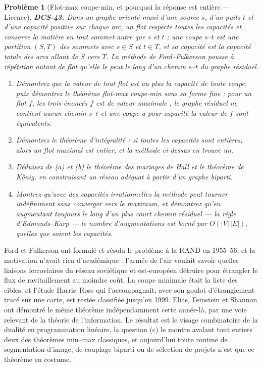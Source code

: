 \documentclass[11pt]{article}
\newtheorem{problem}{Problème}
\begin{document}
\begin{problem}[{Flot-max coupe-min, et pourquoi la réponse est entière --- Licence}]
\textbf{DCS-43.} Dans un graphe orienté muni d'une source $ s $, d'un puits $ t $ et d'une capacité positive sur chaque arc, un \textit{flot} respecte toutes les capacités et conserve la matière en tout sommet autre que $ s $ et $ t $ ; une \textit{coupe} $ s $--$ t $ est une partition $ (S,T) $ des sommets avec $ s \in S $ et $ t \in T $, et sa capacité est la capacité totale des arcs allant de $ S $ vers $ T $. La méthode de Ford--Fulkerson pousse à répétition autant de flot qu'elle le peut le long d'un chemin $ s $--$ t $ du graphe résiduel.
\begin{enumerate}
\item[(a)] Démontrez que la valeur de tout flot est au plus la capacité de toute coupe, puis démontrez le théorème flot-max coupe-min sous sa forme fine : pour un flot $ f $, les trois énoncés \og{} $ f $ est de valeur maximale \fg{}, \og{} le graphe résiduel ne contient aucun chemin $ s $--$ t $ \fg{} et \og{} une coupe a pour capacité la valeur de $ f $ \fg{} sont équivalents.
\item[(b)] Démontrez le théorème d'intégralité : si toutes les capacités sont entières, alors un flot maximal est entier, et la méthode ci-dessus en trouve un.
\item[(c)] Déduisez de (a) et (b) le théorème des mariages de Hall et le théorème de K\H{o}nig, en construisant un réseau adéquat à partir d'un graphe biparti.
\item[(d)] Montrez qu'avec des capacités irrationnelles la méthode peut tourner indéfiniment sans converger vers le maximum, et démontrez qu'en augmentant toujours le long d'un \textit{plus court} chemin résiduel --- la règle d'Edmonds--Karp --- le nombre d'augmentations est borné par $ O(|V|\,|E|) $, quelles que soient les capacités.
\end{enumerate}

\end{problem}

\noindent Ford et Fulkerson ont formulé et résolu le problème à la RAND en 1955--56, et la motivation n'avait rien d'académique : l'armée de l'air voulait savoir quelles liaisons ferroviaires du réseau soviétique et est-européen détruire pour étrangler le flux de ravitaillement au moindre coût. La coupe minimale était la liste des cibles, et l'étude Harris--Ross qui l'accompagnait, avec son goulot d'étranglement tracé sur une carte, est restée classifiée jusqu'en 1999. Elias, Feinstein et Shannon ont démontré le même théorème indépendamment cette année-là, par une voie relevant de la théorie de l'information. Le résultat est le visage combinatoire de la dualité en programmation linéaire, la question (c) le montre avalant tout entiers deux des théorèmes min--max classiques, et aujourd'hui toute routine de segmentation d'image, de couplage biparti ou de sélection de projets n'est que ce théorème en costume.
\end{document}
